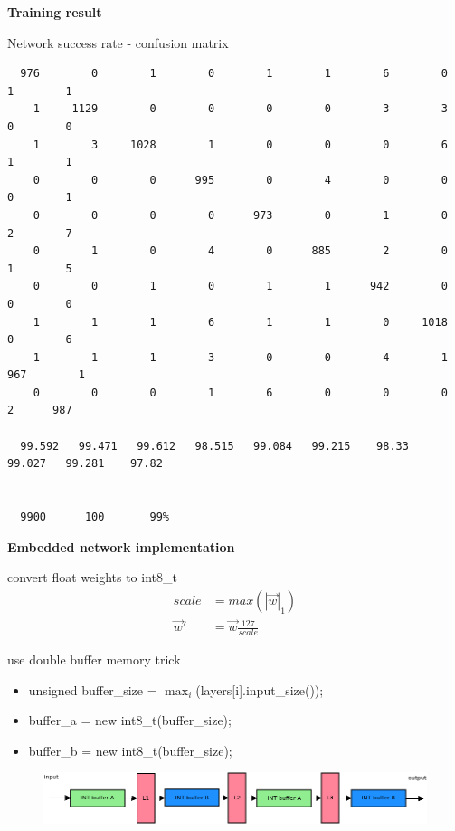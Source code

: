 \documentclass[xcolor=dvipsnames]{beamer}
\begin{document}
\begin{frame}[fragile]
{\bf Training result}

Network success rate - confusion matrix

{\tiny
  \begin{verbatim}
  976        0        1        0        1        1        6        0        1        1
    1     1129        0        0        0        0        3        3        0        0
    1        3     1028        1        0        0        0        6        1        1
    0        0        0      995        0        4        0        0        0        1
    0        0        0        0      973        0        1        0        2        7
    0        1        0        4        0      885        2        0        1        5
    0        0        1        0        1        1      942        0        0        0
    1        1        1        6        1        1        0     1018        0        6
    1        1        1        3        0        0        4        1      967        1
    0        0        0        1        6        0        0        0        2      987

  99.592   99.471   99.612   98.515   99.084   99.215    98.33   99.027   99.281    97.82


  9900      100       99%
  \end{verbatim}
}

\end{frame}




\begin{frame}{\bf Embedded network implementation}

convert float weights to int8\_t
\begin{align*}
  scale &= max{(|\vec{w}|_1)} \\
  \vec{w}' &= \vec{w}\frac{127}{scale}
\end{align*}


use double buffer memory trick

\begin{itemize}
  \item unsigned buffer\_size = $\max_{i}$(layers[i].input\_size());
  \item buffer\_a = new int8\_t(buffer\_size);
  \item buffer\_b = new int8\_t(buffer\_size);
\end{itemize}

\begin{figure}
  \includegraphics[scale=0.3]{../diagrams/nn_memory.png}
\end{figure}

\end{frame}
\end{document}
